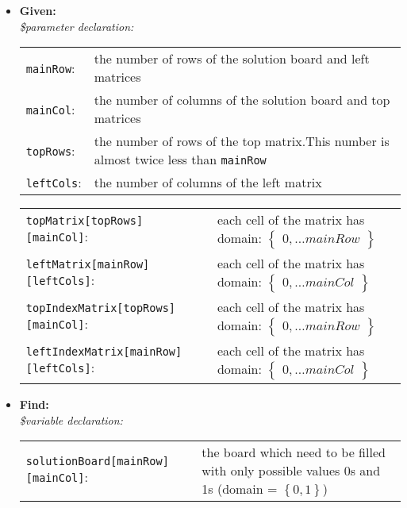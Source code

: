 \begin{itemize}
	\item \textbf{Given:}\\
	\textit{\$parameter declaration:}\\
	\begin{tabular}{l p{12cm}}
	\texttt{mainRow}: & the number of rows of the solution board and left matrices\\
	\texttt{mainCol}:	& the number of columns of the solution board and top matrices\\
	\texttt{topRows}:	& the number of rows of the top matrix.This number is almost twice less than \texttt{mainRow}\\
	\texttt{leftCols}:	& the number of columns of the left matrix\\
	\end{tabular}


	\begin{tabular}{l p{12cm}}
	\texttt{topMatrix[topRows][mainCol]}: & each cell of the matrix has domain: $\left\{ \begin{matrix} 0,\ldots mainRow\end{matrix} \right\}$\\

	\texttt{leftMatrix[mainRow][leftCols]}: & each cell of the matrix has domain: $\left\{\begin{matrix} 0,\ldots mainCol\end{matrix} \right\}$\\

	\texttt{topIndexMatrix[topRows][mainCol]}: & each cell of the matrix has domain: $\left\{ \begin{matrix} 0,\ldots mainRow\end{matrix} \right\}$\\

	\texttt{leftIndexMatrix[mainRow][leftCols]}: & each cell of the matrix has domain: $\left\{\begin{matrix} 0,\ldots mainCol\end{matrix} \right\}$\\
	\end{tabular}


	\item \textbf{Find:}\\
	\textit{\$variable declaration:}\\

	\begin{tabular}{l p{8cm}}
	\texttt{solutionBoard[mainRow][mainCol]}: & the board which need to be filled with only possible values 0s and 1s (domain = $\left\{ 0,1 \right\}$)\\
	\end{tabular}


\end{itemize}
